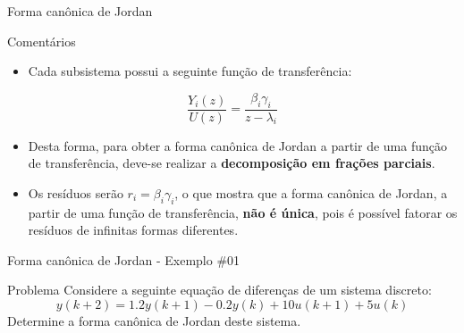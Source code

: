 \begin{frame}{Forma canônica de Jordan}
\begin{block}{Comentários}
\begin{itemize}
    \item Cada subsistema possui a seguinte função de transferência:
\end{itemize}
$$\dfrac{Y_i(z)}{U(z)} = \dfrac{\beta_i \gamma_i}{z - \lambda_i}$$
\vspace{-0.3cm}
\begin{itemize}
    \item Desta forma, para obter a forma canônica de Jordan a partir de uma função de transferência, deve-se realizar a \textbf{decomposição em frações parciais}.
    \item Os resíduos serão $r_i = \beta_i \gamma_i$, o que mostra que a forma  canônica de Jordan, a partir de uma função  de transferência, \textbf{não é única}, pois é possível  fatorar os resíduos de infinitas formas diferentes.
\end{itemize}
\end{block}
\end{frame}

\begin{frame}{Forma canônica de Jordan - Exemplo \#01}
\begin{block}{Problema}
Considere a seguinte equação de diferenças de um sistema discreto:
$$y(k+2) = \num{1,2}y(k+1) - \num{0,2}y(k) + 10u(k+1)+5u(k)$$
Determine a forma canônica de Jordan deste sistema.
\end{block}
\end{frame}

